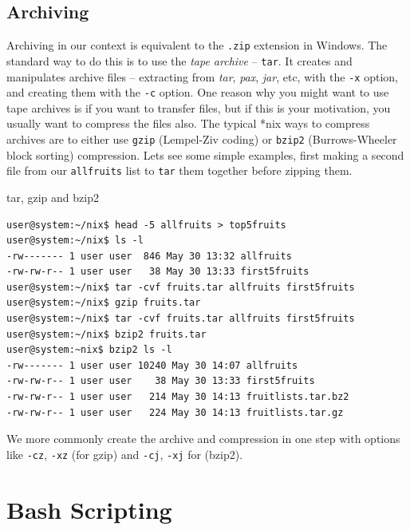 \documentclass[11pt]{article}
\begin{document}
\subsection{Archiving}

Archiving in our context is equivalent to the \texttt{.zip} extension in Windows. The standard way to do this is to use the \emph{tape archive} -- \texttt{tar}. It creates and manipulates archive files -- extracting from \emph{tar}, \emph{pax}, \emph{jar}, etc, with the \texttt{-x} option, and creating them with the \texttt{-c} option. One reason why you might want to use tape archives is if you want to transfer files, but if this is your motivation, you usually want to compress the files also. The typical *nix ways to compress archives are to either use \texttt{gzip} (Lempel-Ziv coding) or \texttt{bzip2} (Burrows-Wheeler block sorting) compression. Lets see some simple examples, first making a second file from our \texttt{allfruits} list to \texttt{tar} them together before zipping them.\\

\begin{listing}[H]
\caption{tar, gzip and bzip2}\vspace{-0.1in}
\begin{verbatim}
user@system:~/nix$ head -5 allfruits > top5fruits
user@system:~/nix$ ls -l
-rw------- 1 user user  846 May 30 13:32 allfruits
-rw-rw-r-- 1 user user   38 May 30 13:33 first5fruits
user@system:~/nix$ tar -cvf fruits.tar allfruits first5fruits
user@system:~/nix$ gzip fruits.tar
user@system:~/nix$ tar -cvf fruits.tar allfruits first5fruits
user@system:~/nix$ bzip2 fruits.tar
user@system:~nix$ bzip2 ls -l
-rw------- 1 user user 10240 May 30 14:07 allfruits
-rw-rw-r-- 1 user user    38 May 30 13:33 first5fruits
-rw-rw-r-- 1 user user   214 May 30 14:13 fruitlists.tar.bz2
-rw-rw-r-- 1 user user   224 May 30 14:13 fruitlists.tar.gz
\end{verbatim}
\end{listing}

\noindent
We more commonly create the archive and compression in one step with options like \texttt{-cz}, \texttt{-xz} (for gzip) and \texttt{-cj}, \texttt{-xj} for (bzip2).

\section{Bash Scripting}
\end{document}
